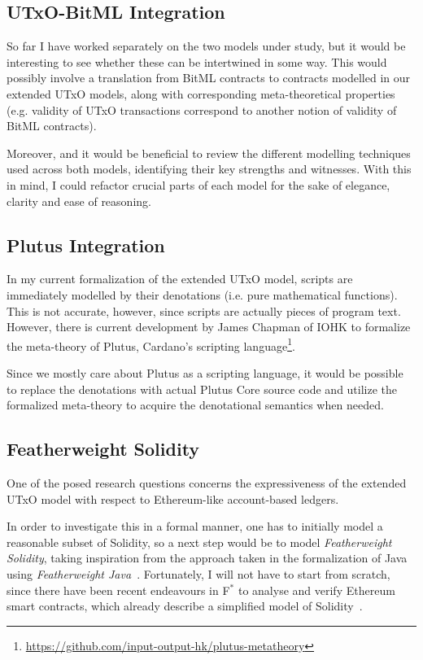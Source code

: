 \documentclass[acmsmall,nonacm=true,screen=true]{acmart}
\newcommand\site[1]{\footnote{\url{#1}}}
\begin{document}
\subsection{UTxO-BitML Integration}
So far I have worked separately on the two models under study, but it would be interesting to see whether these
can be intertwined in some way.
This would possibly involve a translation from BitML contracts to contracts modelled in our extended UTxO models,
along with corresponding meta-theoretical properties (e.g. validity of UTxO transactions correspond to another notion
of validity of BitML contracts).

Moreover, and it would be beneficial to review the different modelling techniques used across both models,
identifying their key strengths and witnesses.
With this in mind, I could refactor crucial parts of each model for the sake of elegance, clarity and ease of reasoning.

\subsection{Plutus Integration}
In my current formalization of the extended UTxO model, scripts are immediately modelled by their denotations
(i.e. pure mathematical functions). This is not accurate, however, since scripts are actually pieces of program text.
However, there is current development by James Chapman of IOHK to formalize the meta-theory of Plutus,
Cardano's scripting language\site{https://github.com/input-output-hk/plutus-metatheory}.

Since we mostly care about Plutus as a scripting language, it would be possible to replace the denotations with
actual Plutus Core source code and utilize the formalized meta-theory to acquire the denotational semantics when needed.

\subsection{Featherweight Solidity}
One of the posed research questions concerns the expressiveness of the extended UTxO model with respect to
Ethereum-like account-based ledgers.

In order to investigate this in a formal manner, one has to initially model a reasonable subset of Solidity,
so a next step would be to model \textit{Featherweight Solidity}, taking inspiration from the
approach taken in the formalization of Java using \textit{Featherweight Java}~\cite{featherweightjava}.
Fortunately, I will not have to start from scratch, since there have been recent endeavours in F$^*$ to analyse and
verify Ethereum smart contracts, which already describe a simplified model of Solidity~\cite{short}.
\end{document}

